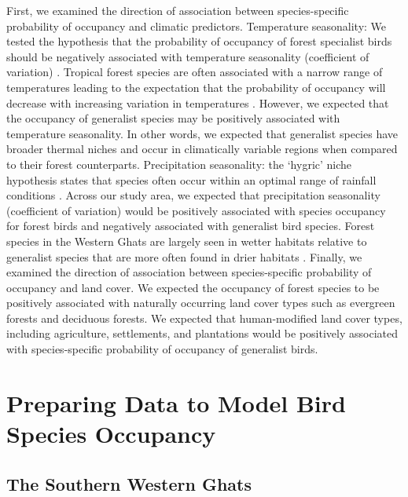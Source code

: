 First, we examined the direction of association between species-specific probability of occupancy and climatic predictors.
Temperature seasonality: We tested the hypothesis that the probability of occupancy of forest specialist birds should be negatively associated with temperature seasonality (coefficient of variation) \citep{srinivasan2018}.
Tropical forest species are often associated with a narrow range of temperatures leading to the expectation that the probability of occupancy will decrease with increasing variation in temperatures \citep{janzen1967,stevens1989,frishkoff2016,chan2016,srinivasan2018}.
However, we expected that the occupancy of generalist species may be positively associated with temperature seasonality.
In other words, we expected that generalist species have broader thermal niches and occur in climatically variable regions when compared to their forest counterparts.
Precipitation seasonality: the `hygric' niche hypothesis states that species often occur within an optimal range of rainfall conditions \citep{boyle2020}.
Across our study area, we expected that precipitation seasonality (coefficient of variation) would be positively associated with species occupancy for forest birds and negatively associated with generalist bird species.
Forest species in the Western Ghats are largely seen in wetter habitats relative to generalist species that are more often found in drier habitats \citep{raman2006}.
Finally, we examined the direction of association between species-specific probability of occupancy and land cover.
We expected the occupancy of forest species to be positively associated with naturally occurring land cover types such as evergreen forests and deciduous forests.
We expected that human-modified land cover types, including agriculture, settlements, and plantations would be positively associated with species-specific probability of occupancy of generalist birds.

\section*{Preparing Data to Model Bird Species Occupancy}

\subsection*{The Southern Western Ghats}

